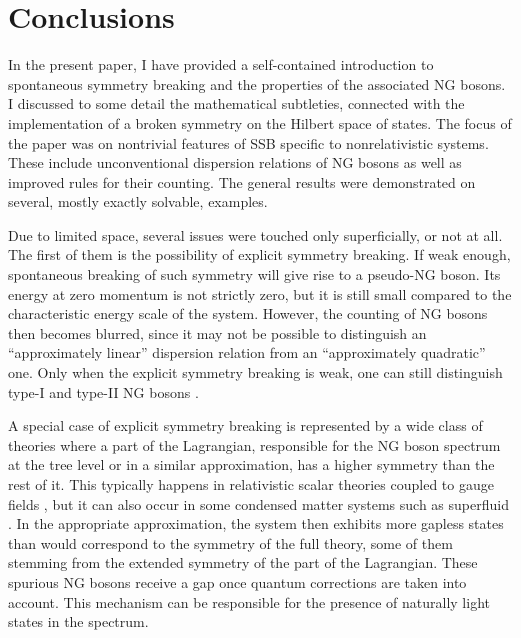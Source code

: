 \documentclass[final,3p,times,12pt,a4paper,sort&compress]{elsarticle}
\begin{document}

\section{Conclusions}
\label{sec:summary} In the present paper, I have provided a self-contained
introduction to spontaneous symmetry breaking and the properties of the
associated NG bosons. I discussed to some detail the mathematical subtleties,
connected with the implementation of a broken symmetry on the Hilbert space of
states. The focus of the paper was on nontrivial features of SSB specific to
nonrelativistic systems. These include unconventional dispersion relations of
NG bosons as well as improved rules for their counting. The general results
were demonstrated on several, mostly exactly solvable, examples.

Due to limited space, several issues were touched only superficially, or
not at all. The first of them is the possibility of explicit symmetry breaking.
If weak enough, spontaneous breaking of such symmetry will give rise to a
pseudo-NG boson. Its energy at zero momentum is not strictly zero, but it is
still small compared to the characteristic energy scale of the system. However,
the counting of NG bosons then becomes blurred, since it may not be possible to
distinguish an ``approximately linear'' dispersion relation from an
``approximately quadratic'' one. Only when the explicit symmetry breaking is
weak, one can still distinguish type-I and type-II NG bosons
\cite{Brauner:2007uw}.

A special case of explicit symmetry breaking is represented by a wide class of
theories where a part of the Lagrangian, responsible for the NG boson spectrum
at the tree level or in a similar approximation, has a higher symmetry than the
rest of it. This typically happens in relativistic scalar theories coupled to
gauge fields \cite{Weinberg:1972fn,Coleman:1973jx}, but it can also occur in
some condensed matter systems such as superfluid 
\cite{Volovik:1982vo,Volovik:1983vo}. In the appropriate approximation, the
system then exhibits more gapless states than would correspond to the symmetry
of the full theory, some of them stemming from the extended symmetry of the
part of the Lagrangian. These spurious NG bosons receive a gap once quantum
corrections are taken into account. This mechanism can be responsible for the
presence of naturally light states in the spectrum.
\end{document}
